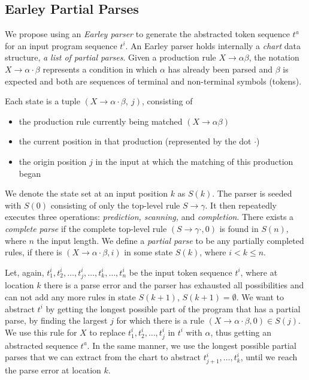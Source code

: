 \subsection{Earley Partial Parses}
\label{sec:prog-abstract:partial}

We propose using an \emph{Earley parser} to generate the abstracted token
sequence $t^a$ for an input program sequence $t^i$. An Earley parser holds
internally a \emph{chart} data structure, \ie \emph{a list of partial parses}.
Given a production rule $X \rightarrow \alpha \beta$, the notation $X
\rightarrow \alpha \cdot \beta$ represents a condition in which $\alpha$ has
already been parsed and $\beta$ is expected and both are sequences of terminal
and non-terminal symbols (tokens).

Each state is a tuple $(X \rightarrow \alpha \cdot \beta,\ j)$, consisting of
\begin{itemize}
    \item the production rule currently being matched $(X \rightarrow \alpha
    \beta)$
    \item the current position in that production (represented by the dot
    $\cdot$)
    \item the origin position $j$ in the input at which the matching of this
    production began
\end{itemize}

We denote the state set at an input position $k$ as $S(k)$. The parser is seeded
with $S(0)$ consisting of only the top-level rule $S \rightarrow \gamma$. It
then repeatedly executes three operations: \emph{prediction, scanning,} and
\emph{completion}. There exists a \emph{complete parse} if the complete
top-level rule $(S \rightarrow \gamma \cdot, 0)$ is found in $S(n)$, where $n$
the input length. We define a \emph{partial parse} to be any partially completed
rules, \ie if there is $(X \rightarrow \alpha \cdot \beta, i)$ in some state
$S(k)$, where $i < k \leq n$.

Let, again, $t^i_1, t^i_2, \dots, t^i_j, \dots, t^i_k, \dots, t^i_n$ be the
input token sequence $t^i$, where at location $k$ there is a parse error and the
parser has exhausted all possibilities and can not add any more rules in state
$S(k + 1)$, \ie $S(k + 1) = \emptyset$. We want to abstract $t^i$ by getting the
longest possible part of the program that has a partial parse, \ie by finding
the largest $j$ for which there is a rule $(X \rightarrow \alpha \cdot \beta, 0)
\in S(j)$. We use this rule for $X$ to replace $t^i_1, t^i_2, \dots, t^i_j$ in
$t^i$ with $\alpha$, thus getting an abstracted sequence $t^a$. In the same
manner, we use the longest possible partial parses that we can extract from the
chart to abstract $t^i_{j+1}, \dots, t^i_k$, until we reach the parse error at
location $k$.

